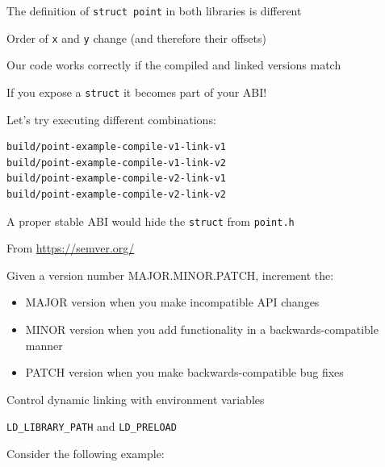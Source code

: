   \begin{slide}


    The definition of \texttt{struct point} in both libraries is different

    \leftspace{}Order of \texttt{x} and \texttt{y} change (and therefore their
    offsets)
    \medskip

    Our code works correctly if the compiled and linked versions match

    \leftspace{}If you expose a \texttt{struct} it becomes part of your ABI!
    \bigskip

    Let's try executing different combinations:
    \begin{verbatim}
build/point-example-compile-v1-link-v1
build/point-example-compile-v1-link-v2
build/point-example-compile-v2-link-v1
build/point-example-compile-v2-link-v2
    \end{verbatim}
    \medskip

    A proper stable ABI would hide the \texttt{struct} from
    \texttt{point.h}
  \end{slide}

  \begin{slide}


    From \url{https://semver.org/}
    \medskip

    Given a version number MAJOR.MINOR.PATCH, increment the:
    \begin{itemize}
      \item MAJOR version when you make incompatible API changes
      \item MINOR version when you add functionality in a backwards-compatible
            manner
      \item PATCH version when you make backwards-compatible bug fixes
    \end{itemize}
  \end{slide}

\begin{slide}
  

  Control dynamic linking with environment variables

  \leftspace{}\texttt{LD\_LIBRARY\_PATH} and \texttt{LD\_PRELOAD}
  \medskip

  Consider the following example:

  \inputminted{c}{alloc-example.c}
\end{slide}

